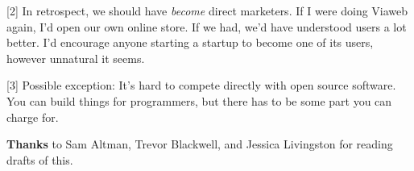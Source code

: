                    [2] In retrospect, we should have \emph{become} direct
                    marketers. If I were doing Viaweb again, I'd open our own
                    online store. If we had, we'd have understood users a lot
                    better. I'd encourage anyone starting a startup to become
                    one of its users, however unnatural it seems.

[3] Possible exception: It's hard to compete directly with
                    open source software. You can build things for programmers,
                    but there has to be some part you can charge for.

\textbf{Thanks}
                    to Sam Altman, Trevor Blackwell, and Jessica Livingston for
                    reading drafts of this.



              
            
          
            
              
                


                  
              
            
          
